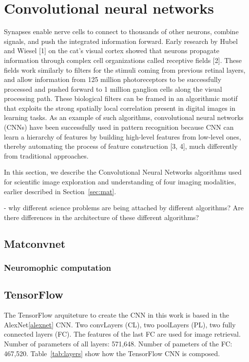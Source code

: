 \section{Convolutional neural networks}\label{sec:met}
Synapses enable nerve cells to connect to thousands of other neurons, combine signals, and push the integrated information forward. Early research by Hubel and Wiesel [1] on the cat’s visual cortex showed that neurons propagate information through complex cell organizations called receptive fields [2]. These fields work similarly to filters for the stimuli coming from previous retinal layers, and allow information from 125 million photoreceptors to be successfully processed and pushed forward to 1 million ganglion cells along the visual processing path. These biological filters can be framed in an algorithmic motif that exploits the strong spatially local correlation present in digital images in learning tasks. As an example of such algorithms, convolutional neural networks (CNNs) have been successfully used in pattern recognition because CNN can learn a hierarchy of features by building high-level features from low-level ones, thereby automating the process of feature construction [3, 4], much differently from traditional approaches.

In this section, we describe the Convolutional Neural Networks algorithms used for scientific image exploration and understanding of four imaging modalities, earlier described in Section~\ref{sec:mat}.

- why different science problems are being attached by different algorithms? Are there differences in the architecture of these different algorithms?


\subsection{Matconvnet}

\subsubsection{Neuromophic computation}


\subsection{TensorFlow}

The TensorFlow arquiteture to create the CNN in this work is based in the AlexNet\ref{alexnet} CNN.  Two convLayers (CL), two poolLayers (PL), two fully connected layers (FC). The features of the last FC are used for image retrieval. Number of parameters of all layers: 571,648. Number of pameters of the FC: 467,520. Table~\ref{tab:layers} show how the TensorFlow CNN is composed.


